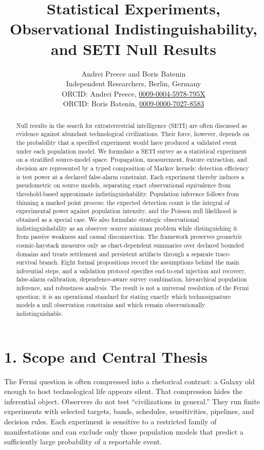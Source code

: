 \documentclass[11pt,a4paper]{article}
\title{Statistical Experiments, Observational Indistinguishability, and SETI Null Results}
\author{Andrei Preece and Boris Batenin\\
\small Independent Researchers, Berlin, Germany\\
\small ORCID: Andrei Preece, \href{https://orcid.org/0009-0004-5978-795X}{0009-0004-5978-795X}\\
\small ORCID: Boris Batenin, \href{https://orcid.org/0009-0000-7027-8583}{0009-0000-7027-8583}}
\date{}
\begin{document}
\maketitle

\begin{abstract}
Null results in the search for extraterrestrial intelligence (SETI) are often discussed as evidence against abundant technological civilizations. Their force, however, depends on the probability that a specified experiment would have produced a validated event under each population model. We formulate a SETI survey as a statistical experiment on a stratified source-model space. Propagation, measurement, feature extraction, and decision are represented by a typed composition of Markov kernels; detection efficiency is test power at a declared false-alarm constraint. Each experiment thereby induces a pseudometric on source models, separating exact observational equivalence from threshold-based approximate indistinguishability. Population inference follows from thinning a marked point process: the expected detection count is the integral of experimental power against population intensity, and the Poisson null likelihood is obtained as a special case. We also formulate strategic observational indistinguishability as an observer--source minimax problem while distinguishing it from passive weakness and causal disconnection. The framework preserves geometric cosmic-haystack measures only as chart-dependent summaries over declared bounded domains and treats settlement and persistent artifacts through a separate trace-survival branch. Eight formal propositions record the assumptions behind the main inferential steps, and a validation protocol specifies end-to-end injection and recovery, false-alarm calibration, dependence-aware survey combination, hierarchical population inference, and robustness analysis. The result is not a universal resolution of the Fermi question; it is an operational standard for stating exactly which technosignature models a null observation constrains and which remain observationally indistinguishable.
\end{abstract}

\section{1. Scope and Central Thesis}\label{1-scope-and-central-thesis}

The Fermi question is often compressed into a rhetorical contrast: a Galaxy old enough to host technological life appears silent. That compression hides the inferential object. Observers do not test ``civilizations in general.'' They run finite experiments with selected targets, bands, schedules, sensitivities, pipelines, and decision rules. Each experiment is sensitive to a restricted family of manifestations and can exclude only those population models that predict a sufficiently large probability of a reportable event. \citep{tarter2001,nasa2018,haqqmisra2022,sheikh2020,socasnavarro2021}
\end{document}
